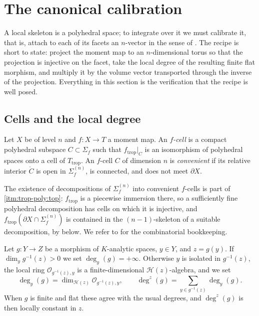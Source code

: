 \section{The canonical calibration}
\label{sec:trop-calibration}

A local skeleton is a polyhedral space; to integrate over it we must
calibrate it, that is, attach to each of its facets an $n$-vector in the
sense of . The recipe is short to state: project
the moment map to an $n$-dimensional torus so that the projection is
injective on the facet, take the local degree of the resulting finite flat
morphism, and multiply it by the volume vector transported through the
inverse of the projection. Everything in this section is the verification
that the recipe is well posed.

\subsection{Cells and the local degree}

\begin{definition}
\label{def:trop-f-cell}
Let $X$ be of level $n$ and $f:X\to T$ a moment map. An \emph{$f$-cell} is a
compact polyhedral subspace $C\subset\Sigma_f$ such that
$f_{\mathrm{trop}}|_C$ is an isomorphism of polyhedral spaces onto a cell of
$T_{\mathrm{trop}}$. An $f$-cell $C$ of dimension $n$ is \emph{convenient}
if its relative interior $\mathring C$ is open in $\Sigma_f^{(n)}$, is
connected, and does not meet $\partial X$.
\end{definition}

The existence of decompositions of $\Sigma_f^{(n)}$ into convenient
$f$-cells is part of 
\cref{itm:trop-poly:top}: $f_{\mathrm{trop}}$ is a piecewise immersion there,
so a sufficiently fine polyhedral decomposition has cells on which it is
injective, and $f_{\mathrm{trop}}(\partial X\cap\Sigma_f^{(n)})$ is
contained in the $(n-1)$-skeleton of a suitable decomposition, by
 below. We refer to
\cite[Lemma~14.1.5 and Proposition~14.1.12]{CLD25} for the combinatorial
bookkeeping.

\begin{definition}
\label{def:trop-local-degree}
Let $g:Y\to Z$ be a morphism of $K$-analytic spaces, $y\in Y$, and
$z=g(y)$. If $\dim_yg^{-1}(z)>0$ we set $\deg_y(g)=+\infty$. Otherwise $y$
is isolated in $g^{-1}(z)$, the local ring $\mathcal O_{g^{-1}(z),y}$ is a
finite-dimensional $\mathcal H(z)$-algebra, and we set
\[
 \deg_y(g)=\dim_{\mathcal H(z)}\mathcal O_{g^{-1}(z),y},
 \qquad
 \deg^z(g)=\sum_{y\in g^{-1}(z)}\deg_y(g).
\]
When $g$ is finite and flat these agree with the usual degrees, and
$\deg^z(g)$ is then locally constant in $z$.
\end{definition}

